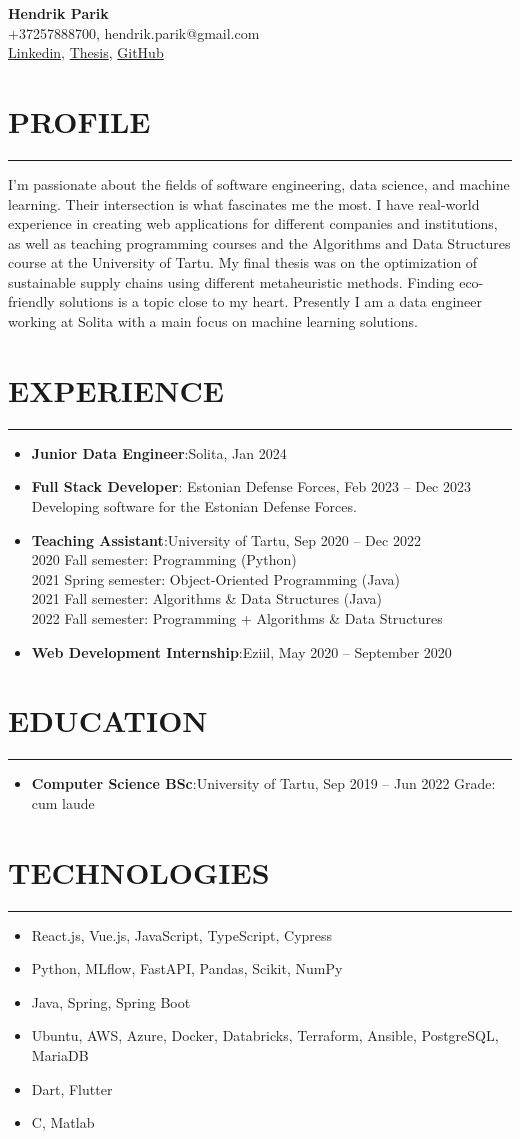 \documentclass[a4paper,10pt]{article}
\makeatletter
\newcommand{\name}{Hendrik Parik}
\newcommand{\contact}{+37257888700, hendrik.parik@gmail.com}
\newcommand{\linkedin}{\href{https://www.linkedin.com/in/hendrik-parik-334003200/}{Linkedin}}
\newcommand{\thesis}{\href{https://www.springerprofessional.de/en/performance-assessment-of-the-main-metaheuristics-for-sustainabl/23753754}{Thesis}}
\newcommand{\github}{\href{https://github.com/hendrik127}{GitHub}}
\newcommand{\profile}{I'm passionate about the fields of software engineering, data science, and machine learning. Their intersection is what fascinates me the most. I have real-world experience in creating web applications for different companies and institutions, as well as teaching programming courses and the Algorithms and Data Structures course at the University of Tartu. My final thesis was on the optimization of sustainable supply chains using different metaheuristic methods. Finding eco-friendly solutions is a topic close to my heart. Presently I am a data engineer working at Solita with a main focus on machine learning solutions.

}
\newcommand{\cvsection}[1]{\section*{\MakeUppercase{#1}}\hrule\vspace{0.5em}}
\newcommand{\cvitem}[2]{\textbf{#1}:\hspace{0.5em}#2}
\makeatother
\begin{document}

\begin{center}
    {\Huge\textbf{\name}}\\
    \vspace{0.5em}
    \contact\\
    \linkedin, \thesis, \github%
\end{center}

\cvsection{Profile}
     \profile


\cvsection{Experience}
\begin{itemize}[leftmargin=*]

    \item \cvitem{Junior Data Engineer}{Solita, Jan 2024}
    \item \cvitem{Full Stack Developer}{
    Estonian Defense Forces, Feb 2023 -- Dec 2023}\\
    Developing software for the Estonian Defense Forces.
    
    \item \cvitem{Teaching Assistant}{University of Tartu, Sep 2020 -- Dec 2022}\\
    2020 Fall semester: Programming (Python)\\
    2021 Spring semester: Object-Oriented Programming (Java)\\
    2021 Fall semester: Algorithms \& Data Structures (Java)\\
    2022 Fall semester: Programming + Algorithms \& Data Structures

    \item \cvitem{Web Development Internship}{Eziil, May 2020 -- September 2020}
    
    
    
\end{itemize}

\cvsection{Education}
\begin{itemize}[leftmargin=*]
   
    \item \cvitem{Computer Science BSc}{University of Tartu, Sep 2019 -- Jun 2022}
    Grade: cum laude
    
\end{itemize}

\cvsection{Technologies}
\begin{itemize}[leftmargin=*]
    \item React.js, Vue.js, JavaScript, TypeScript, Cypress
    \item Python, MLflow, FastAPI, Pandas, Scikit, NumPy
    \item Java, Spring, Spring Boot
    \item Ubuntu, AWS, Azure, Docker, Databricks, Terraform, Ansible, PostgreSQL, MariaDB
    \item Dart, Flutter 
    \item C, Matlab
\end{itemize}
\end{document}
